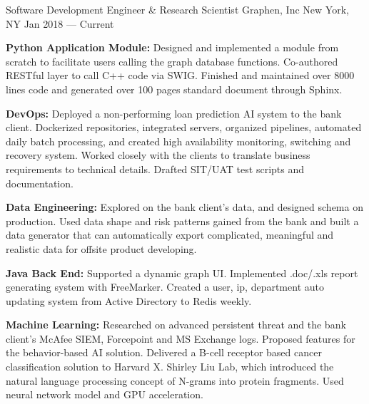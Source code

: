 

\begin{cventries}
	
	\cventry
	{Software Development Engineer \& Research Scientist} %
	{Graphen, Inc} %
	{New York, NY} %
	{Jan 2018 –– Current} %
	{
		\begin{cvitems} %
			\item {\textbf{Python Application Module:} Designed and implemented a module from scratch to facilitate users calling the graph database functions. Co-authored RESTful layer to call C++ code via SWIG. Finished and maintained over 8000 lines code and generated over 100 pages standard document through Sphinx.}
			\item {\textbf{DevOps:} Deployed a non-performing loan prediction AI system to the bank client. Dockerized repositories, integrated servers, organized pipelines, automated daily batch processing, and created high availability monitoring, switching and recovery system. Worked closely with the clients to translate business requirements to technical details. Drafted SIT/UAT test scripts and documentation.}
			\item {\textbf{Data Engineering:} Explored on the bank client's data, and designed schema on production. Used data shape and risk patterns gained from the bank and built a data generator that can automatically export complicated, meaningful and realistic data for offsite product developing.}
			\item {\textbf{Java Back End:} Supported a dynamic graph UI. Implemented .doc/.xls report generating system with FreeMarker. Created a user, ip, department auto updating system from Active Directory to Redis weekly.}
			\item {\textbf{Machine Learning:} Researched on advanced persistent threat and the bank client's McAfee SIEM, Forcepoint and MS Exchange logs. Proposed features for the behavior-based AI solution. Delivered a B-cell receptor based cancer classification solution to Harvard X. Shirley Liu Lab, which introduced the natural language processing concept of N-grams into protein fragments. Used neural network model and GPU acceleration.}
		\end{cvitems}
	}


\end{cventries}

